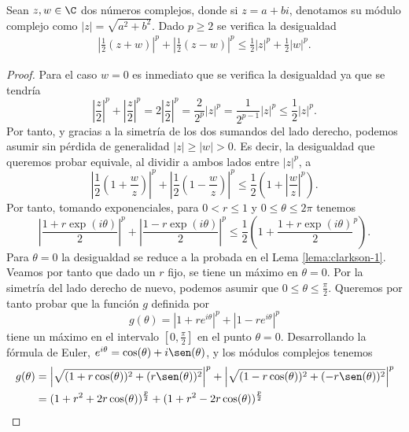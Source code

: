 \begin{lemma} \label{lema:clarkson-2}
    Sean $ z, w \in \C $ dos números complejos, donde si $ z = a + bi $, denotamos su módulo complejo como $|z| = \sqrt{a^2 + b^2} $. Dado $ p \geq 2 $ se verifica la desigualdad
    \begin{align}
        \left| \frac{1}{2}(z+w)\right|^p + \left| \frac{1}{2}(z-w)\right|^p \leq \frac{1}{2} |z|^p + \frac{1}{2} |w|^p.
    \end{align}
\end{lemma}
\begin{proof}
    Para el caso $ w = 0 $ es inmediato que se verifica la desigualdad ya que se tendría
    $$
        \left| \frac{z}{2}\right|^p + \left| \frac{z}{2}\right|^p = 2\left|\frac{z}{2}\right|^p = \frac{2}{2^p}\left|z\right|^p = \frac{1}{2^{p-1}}\left|z\right|^p \leq \frac{1}{2}\left|z\right|^p.
    $$
    Por tanto, y gracias a la simetría de los dos sumandos del lado derecho, podemos asumir sin pérdida de generalidad $ |z| \geq |w| > 0 $. Es decir, la desigualdad que queremos probar equivale, al dividir a ambos lados entre $ |z|^p $, a
    $$
        \left| \frac{1}{2}(1+\frac{w}{z})\right|^p + \left| \frac{1}{2}(1-\frac{w}{z})\right|^p \leq \frac{1}{2}\left(1 + \left|\frac{w}{z} \right|^p \right).
    $$
    Por tanto, tomando exponenciales, para $ 0 < r \leq 1 $ y $ 0 \leq \theta \leq 2 \pi $ tenemos
    $$
        \left| \frac{1+r \exp (i \theta)}{2} \right|^p + \left| \frac{1-r \exp (i \theta)}{2} \right|^p \leq \frac{1}{2}\left(1 + \frac{1+r \exp (i \theta)}{2}^p \right).
    $$
    Para $ \theta = 0 $ la desigualdad se reduce a la probada en el Lema \ref{lema:clarkson-1}. Veamos por tanto que dado un $ r $ fijo, se tiene un máximo en $ \theta = 0 $. Por la simetría del lado derecho de nuevo, podemos asumir que $ 0 \leq \theta \leq \frac{\pi}{2} $. Queremos por tanto probar que la función $g$ definida por
    $$
        g(\theta) = |1 + re^{i\theta}|^p + |1 - re^{i\theta}|^p
    $$
    tiene un máximo en el intervalo $[0, \frac{\pi}{2}] $ en el punto $ \theta = 0 $. Desarrollando la fórmula de Euler, $ e^{i\theta} = \cos(\theta) + i\sen(\theta)$,  y los módulos complejos tenemos
    \begin{align}
        g(\theta) &= \left|\sqrt{(1 + r \cos(\theta))^2 + (r\sen(\theta))^2} \right|^p + \left|\sqrt{(1 - r \cos(\theta))^2 + (- r\sen(\theta))^2} \right|^p \\
        &= (1 + r^2 + 2r\cos(\theta))^\frac{p}{2} + (1 + r^2 - 2r\cos(\theta))^\frac{p}{2}
    \end{align}

\end{proof}
